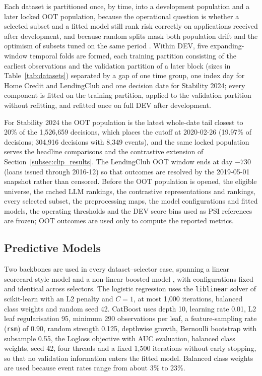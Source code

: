 \documentclass[final,5p,twocolumn]{elsarticle}
\begin{document}
Each dataset is partitioned once, by time, into a development population and a later locked OOT population, because the operational question is whether a selected subset and a fitted model still rank risk correctly on applications received after development, and because random splits mask both population drift and the optimism of subsets tuned on the same period \cite{bergmeir2012,gama2014}. Within DEV, five expanding-window temporal folds are formed, each training partition consisting of the earliest observations and the validation partition of a later block (sizes in Table~\ref{tab:datasets}) separated by a gap of one time group, one index day for Home Credit and LendingClub and one decision date for Stability 2024; every component is fitted on the training partition, applied to the validation partition without refitting, and refitted once on full DEV after development.

For Stability 2024 the OOT population is the latest whole-date tail closest to 20\% of the 1,526,659 decisions, which places the cutoff at 2020-02-26 (19.97\% of decisions; 304,916 decisions with 8,349 events), and the same locked population serves the headline comparisons and the contrastive extension of Section~\ref{subsec:clip_results}. The LendingClub OOT window ends at day $-730$ (loans issued through 2016-12) so that outcomes are resolved by the 2019-05-01 snapshot rather than censored. Before the OOT population is opened, the eligible universe, the cached LLM rankings, the contrastive representations and rankings, every selected subset, the preprocessing maps, the model configurations and fitted models, the operating thresholds and the DEV score bins used as PSI references are frozen; OOT outcomes are used only to compute the reported metrics.

\subsection{Predictive Models}
\label{subsec:models}

Two backbones are used in every dataset--selector case, spanning a linear scorecard-style model and a non-linear boosted model \cite{lessmann2015,gunnarsson2021}, with configurations fixed and identical across selectors. The logistic regression uses the \texttt{liblinear} solver of scikit-learn \cite{pedregosa2011} with an L2 penalty and $C=1$, at most 1,000 iterations, balanced class weights and random seed 42. CatBoost \cite{prokhorenkova2018} uses depth 10, learning rate 0.01, L2 leaf regularisation 95, minimum 290 observations per leaf, a feature-sampling rate (\texttt{rsm}) of 0.90, random strength 0.125, depthwise growth, Bernoulli bootstrap with subsample 0.55, the Logloss objective with AUC evaluation, balanced class weights, seed 42, four threads and a fixed 1,500 iterations without early stopping, so that no validation information enters the fitted model. Balanced class weights are used because event rates range from about 3\% to 23\%.
\end{document}
